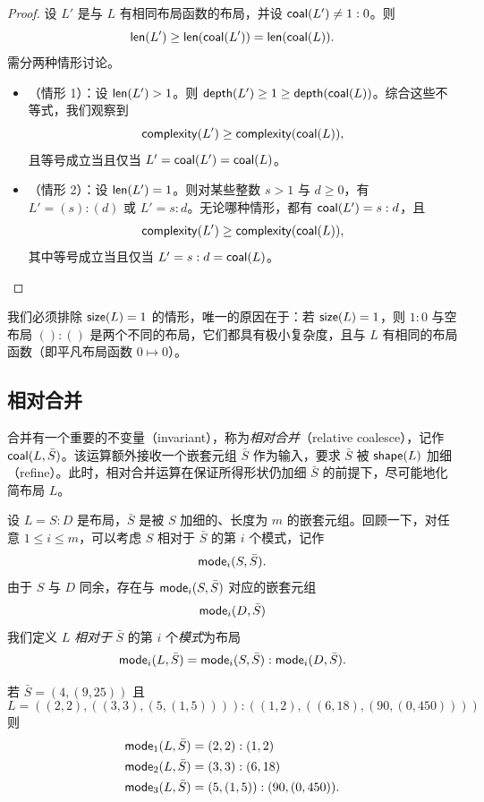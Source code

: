\begin{proof}
设 $L'$ 是与 $L$ 有相同布局函数的布局，并设 $\mathsf{coal}(L') \neq 1:0$。则
\[
\mathsf{len}(L') \geq \mathsf{len}(\mathsf{coal}(L')) = \mathsf{len}(\mathsf{coal}(L)).
\]
需分两种情形讨论。
\begin{itemize}
    \item （情形 1）：设 $\mathsf{len}(L') > 1$。则 $\mathsf{depth}(L') \geq 1 \geq \mathsf{depth}(\mathsf{coal}(L))$。综合这些不等式，我们观察到
    \[
    \mathsf{complexity}(L') \geq \mathsf{complexity}(\mathsf{coal}(L)),
    \]
    且等号成立当且仅当 $L' = \mathsf{coal}(L') = \mathsf{coal}(L)$。
    \item （情形 2）：设 $\mathsf{len}(L') = 1$。则对某些整数 $s>1$ 与 $d \geq 0$，有 $L' = (s):(d)$ 或 $L' = s:d$。无论哪种情形，都有 $\mathsf{coal}(L') = s:d$，且
    \[
    \mathsf{complexity}(L') \geq \mathsf{complexity}(\mathsf{coal}(L)),
    \]
    其中等号成立当且仅当 $L' = s:d = \mathsf{coal}(L)$。
\end{itemize}
\end{proof}

\begin{remark}
    我们必须排除 $\mathsf{size}(L) = 1$ 的情形，唯一的原因在于：若 $\mathsf{size}(L) = 1$，则 $1:0$ 与空布局 $():()$ 是两个不同的布局，它们都具有极小复杂度，且与 $L$ 有相同的布局函数（即平凡布局函数 $0 \mapsto 0$）。
\end{remark}


\subsection{相对合并}
合并有一个重要的不变量（invariant），称为{\it 相对合并}（relative coalesce），记作 $\mathsf{coal}(L,\bar{S})$。该运算额外接收一个嵌套元组 $\bar{S}$ 作为输入，要求 $\bar{S}$ 被 $\mathsf{shape}(L)$ 加细（refine）。此时，相对合并运算在保证所得形状仍加细 $\bar{S}$ 的前提下，尽可能地化简布局 $L$。


\begin{definition}
    设 $L = S:D$ 是布局，$\bar{S}$ 是被 $S$ 加细的、长度为 $m$ 的嵌套元组。回顾一下，对任意 $1 \leq i \leq m$，可以考虑 $S$ 相对于 $\bar{S}$ 的第 $i$ 个模式，记作
    \[
    \mathsf{mode}_i(S,\bar{S}).
    \]
    由于 $S$ 与 $D$ 同余，存在与 $\mathsf{mode}_i(S,\bar{S})$ 对应的嵌套元组
    \[
    \mathsf{mode}_i(D,\bar{S})
    \]
    我们定义 $L$ {\it 相对于} $\bar{S}$ 的第 $i$ 个{\it 模式}为布局
    \[
    \mathsf{mode}_i(L,\bar{S}) = \mathsf{mode}_i(S,\bar{S}):\mathsf{mode}_i(D,\bar{S}).
    \]
\end{definition}

\begin{example}
    若 $\bar{S} = (4,(9,25))$ 且
    \[
    L = ((2,2),((3,3),(5,(1,5)))):((1,2),((6,18),(90,(0,450))))
    \]
    则
    \begin{align*}
    \mathsf{mode}_1(L,\bar{S}) & = (2,2):(1,2)\\
    \mathsf{mode}_2(L,\bar{S}) & = (3,3):(6,18)\\
    \mathsf{mode}_3(L,\bar{S}) & = (5,(1,5)):(90,(0,450)).
    \end{align*}
\end{example}

